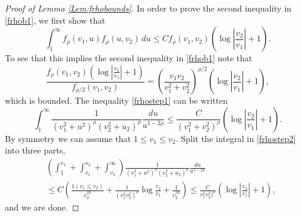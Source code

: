 \documentclass{article}
\numberwithin{equation}{section}
\numberwithin{figure}{section}
\theoremstyle{plain}
\theoremstyle{plain}
\numberwithin{thm}{section}
\theoremstyle{remark}
\let \le \leqslant
\begin{document}
\begin{proof}[Proof of Lemma \ref{Lem:frhobounds}]
In order to prove the second inequality in \eqref{frhob1}, we first show that
\begin{equation}\label{frhostep1}
\int_1^\infty f_\rho(v_1,u)f_\rho(u,v_2)\,du\le Cf_\rho(v_1,v_2)(\log\left|\frac{v_2}{v_1}\right|+1).
\end{equation}
To see that this implies the second inequality in \eqref{frhob1} note that
\begin{equation*}
\frac{f_\rho(v_1,v_2)\left(\log\left|\frac{v_2}{v_1}\right|+1\right)}{f_{\rho/2}(v_1,v_2)}=\left(\frac{v_1v_2}{v_1^2+v_2^2}\right)^{\rho/2}\left(\log\left|\frac{v_2}{v_1}\right|+1\right),
\end{equation*}
which is bounded. The inequality \eqref{frhostep1} can be written
\begin{equation}\label{frhostep2}
\int_1^\infty \frac 1{(v_1^2+u^2)^\rho(v_2^2+u_2)^\rho}\frac{du}{u^{1-2\rho}}\le \frac C{(v_1^2+v_2^2)^\rho}\left(\log\left|\frac{v_2}{v_1}\right|+1\right).
\end{equation}
By symmetry we can assume that $1\le v_1\le v_2$. Split the integral in \eqref{frhostep2} into three parts,
\begin{align*}
&\left(\int_1^{v_1}+\int_{v_1}^{v_2} +\int_{v_2}^\infty\right)\frac 1{(v_1^2+u^2)^\rho(v_2^2+u_2)^\rho}\frac{du}{u^{1-2\rho}}\\
&\le C\left(\frac{1(v_1\le v_2)}{v_2^{2\rho}}+\frac 1{(v_1^2v_2^2)^\rho}\log\frac{v_2}{v_1}+\frac 1{v_2^{2\rho}}\right)\le
\frac C{v_1^2v_2^2)^\rho}(\log\left|\frac{v_2}{v_1}\right|+1),
\end{align*}
and we are done.


\end{proof}
\end{document}
